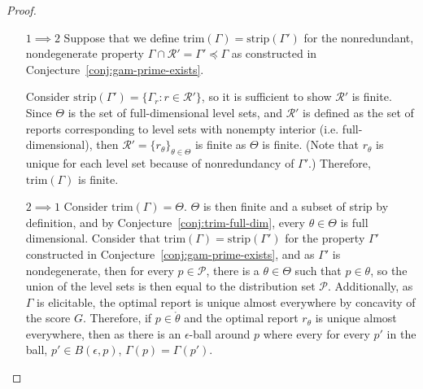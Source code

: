 \documentclass[12pt]{article}
\renewcommand{\P}{\mathcal{P}}
\newcommand{\R}{\mathcal{R}}
\newcommand{\inter}[1]{\mathring{#1}}%
\newcommand{\trim}{\mathrm{trim}}
\newcommand{\strip}{\mathrm{strip}}
\begin{document}
\begin{proof}
\begin{enumerate}
\item [$1 \implies 2$]
Suppose that we define $\trim(\Gamma) = \strip(\Gamma')$ for the nonredundant, nondegenerate property $\Gamma \cap \R' = \Gamma' \preceq \Gamma$ as constructed in Conjecture~\ref{conj:gam-prime-exists}.

Consider $\strip(\Gamma') = \{\Gamma_r : r \in \R'\}$, so it is sufficient to show $\R'$ is finite.
Since $\Theta$ is the set of full-dimensional level sets, and $\R'$ is defined as the set of reports corresponding to level sets with nonempty interior (i.e. full-dimensional), then $\R' = \{r_\theta\}_{\theta \in \Theta}$ is finite as $\Theta$ is finite.
(Note that $r_\theta$ is unique for each level set because of nonredundancy of $\Gamma'$.)
Therefore, $\trim(\Gamma)$ is finite.

\item [$2 \implies 1$]
Consider $\trim(\Gamma) = \Theta$.
$\Theta$ is then finite and a subset of strip by definition, and by Conjecture~\ref{conj:trim-full-dim}, every $\theta \in \Theta$ is full dimensional.
Consider that $\trim(\Gamma) = \strip(\Gamma')$ for the property $\Gamma'$ constructed in Conjecture~\ref{conj:gam-prime-exists}, and as $\Gamma'$ is nondegenerate, then for every $p \in \P$, there is a $\theta \in \Theta$ such that $p \in \theta$, so the union of the level sets is then equal to the distribution set $\P$.
Additionally, as $\Gamma$ is elicitable, the optimal report is unique almost everywhere by concavity of the score $G$.
Therefore, if $p \in \inter{\theta}$ and the optimal report $r_\theta$ is unique almost everywhere, then as there is an $\epsilon$-ball around $p$ where every for every $p'$ in the ball, $p' \in B(\epsilon, p)$, $\Gamma(p) = \Gamma(p')$.


\end{enumerate}
\end{proof}
\end{document}
